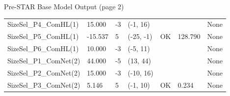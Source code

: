 \documentclass[ignorenonframetext,]{beamer}
\begin{document}
\begin{frame}{Pre-STAR Base Model Output (page 2)}
\begin{table}[ht]
{\begin{tabular}{p{1.9in}p{.6in}p{.6in}p{.9in}p{.4in}p{.4in}p{2in}}
  SizeSel\_P4\_ComHL(1) & 15.000 & -3 & (-1, 16) &  &  & None \\ 
  SizeSel\_P5\_ComHL(1) & -15.537 & 5 & (-25, -1) & OK & 128.790 & None \\ 
  SizeSel\_P6\_ComHL(1) & 10.000 & -3 & (-5, 11) &  &  & None \\ 
  SizeSel\_P1\_ComNet(2) & 44.000 & -5 & (13, 44) &  &  & None \\ 
  SizeSel\_P2\_ComNet(2) & 15.000 & -3 & (-10, 16) &  &  & None \\ 
  SizeSel\_P3\_ComNet(2) & 5.146 & 5 & (-1, 10) & OK & 0.234 & None \\ 
   \hline
\end{tabular}
}
\end{table}

\end{frame}
\end{document}
